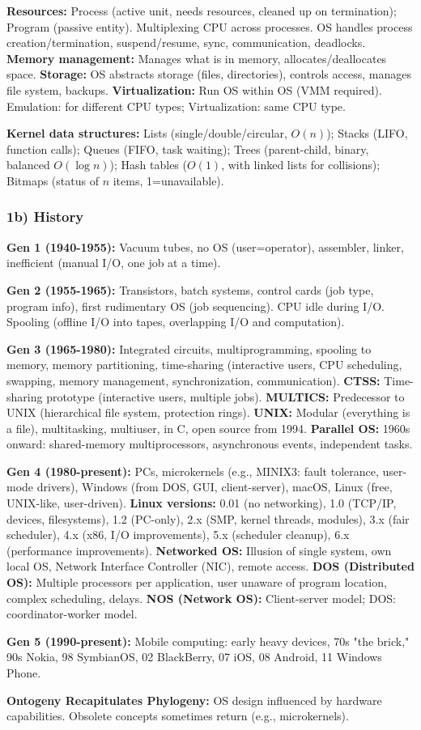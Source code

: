 \textbf{Resources:} Process (active unit, needs resources, cleaned up on termination); Program (passive entity). Multiplexing CPU across processes. OS handles process creation/termination, suspend/resume, sync, communication, deadlocks. \textbf{Memory management:} Manages what is in memory, allocates/deallocates space. \textbf{Storage:} OS abstracts storage (files, directories), controls access, manages file system, backups. \textbf{Virtualization:} Run OS within OS (VMM required). Emulation: for different CPU types; Virtualization: same CPU type.

\textbf{Kernel data structures:} Lists (single/double/circular, $O(n)$); Stacks (LIFO, function calls); Queues (FIFO, task waiting); Trees (parent-child, binary, balanced $O(\log n)$); Hash tables ($O(1)$, with linked lists for collisions); Bitmaps (status of $n$ items, 1=unavailable).


\subsubsection*{1b) History}

\textbf{Gen 1 (1940-1955):} Vacuum tubes, no OS (user=operator), assembler, linker, inefficient (manual I/O, one job at a time).

\textbf{Gen 2 (1955-1965):} Transistors, batch systems, control cards (job type, program info), first rudimentary OS (job sequencing). CPU idle during I/O. Spooling (offline I/O into tapes, overlapping I/O and computation).

\textbf{Gen 3 (1965-1980):} Integrated circuits, multiprogramming, spooling to memory, memory partitioning, time-sharing (interactive users, CPU scheduling, swapping, memory management, synchronization, communication). \textbf{CTSS:} Time-sharing prototype (interactive users, multiple jobs). \textbf{MULTICS:} Predecessor to UNIX (hierarchical file system, protection rings). \textbf{UNIX:} Modular (everything is a file), multitasking, multiuser, in C, open source from 1994. \textbf{Parallel OS:} 1960s onward: shared-memory multiprocessors, asynchronous events, independent tasks.

\textbf{Gen 4 (1980-present):} PCs, microkernels (e.g., MINIX3: fault tolerance, user-mode drivers), Windows (from DOS, GUI, client-server), macOS, Linux (free, UNIX-like, user-driven). \textbf{Linux versions:} 0.01 (no networking), 1.0 (TCP/IP, devices, filesystems), 1.2 (PC-only), 2.x (SMP, kernel threads, modules), 3.x (fair scheduler), 4.x (x86, I/O improvements), 5.x (scheduler cleanup), 6.x (performance improvements). \textbf{Networked OS:} Illusion of single system, own local OS, Network Interface Controller (NIC), remote access. \textbf{DOS (Distributed OS):} Multiple processors per application, user unaware of program location, complex scheduling, delays. \textbf{NOS (Network OS):} Client-server model; DOS: coordinator-worker model.

\textbf{Gen 5 (1990-present):} Mobile computing: early heavy devices, 70s "the brick," 90s Nokia, 98 SymbianOS, 02 BlackBerry, 07 iOS, 08 Android, 11 Windows Phone.

\textbf{Ontogeny Recapitulates Phylogeny:} OS design influenced by hardware capabilities. Obsolete concepts sometimes return (e.g., microkernels).
